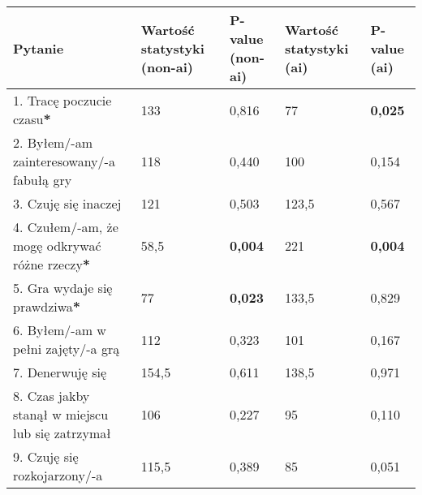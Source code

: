 \begin{table}[h!]
    \begin{center}
        \begin{tabular}{|m{10em}|m{5em}|m{5em}|m{5em}|m{5em}|}
            \hline
            Pytanie                                                           & Wartość statystyki (non-\gls{ai}) & P-value (non-\gls{ai}) & Wartość statystyki (\gls{ai}) & P-value (\gls{ai}) \\
            \hline
            1. Tracę poczucie czasu\textbf{*}                                 & 133                               & 0,816                  & 77                            & \textbf{0,025}     \\
            2. Byłem/-am \newline zainteresowany/-a fabułą gry                & 118                               & 0,440                  & 100                           & 0,154              \\
            3. Czuję się inaczej                                              & 121                               & 0,503                  & 123,5                         & 0,567              \\
            4. Czułem/-am, że mogę odkrywać różne rzeczy\textbf{*}            & 58,5                              & \textbf{0,004}         & 221                           & \textbf{0,004}     \\
            5. Gra wydaje się prawdziwa\textbf{*}                             & 77                                & \textbf{0,023}         & 133,5                         & 0,829              \\
            6. Byłem/-am \newline w pełni zajęty/-a grą                       & 112                               & 0,323                  & 101                           & 0,167              \\
            7. Denerwuję się                                                  & 154,5                             & 0,611                  & 138,5                         & 0,971              \\
            8. Czas jakby stanął w miejscu lub się zatrzymał                  & 106                               & 0,227                  & 95                            & 0,110              \\
            9. Czuję się \newline rozkojarzony/-a                             & 115,5                             & 0,389                  & 85                            & 0,051              \\

\end{tabular}
\end{center}
\end{table}
